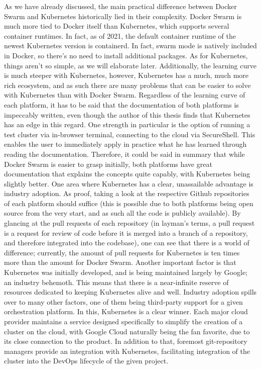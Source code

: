 \documentclass[thesis=B,english]{FITthesis}[2019/12/23]
\begin{document}
As we have already discussed, the main practical difference between Docker Swarm and Kubernetes historically lied in their complexity. Docker Swarm is much more tied to Docker itself than Kubernetes, which supports several container runtimes. In fact, as of 2021, the default container runtime of the newest Kubernetes version is containerd. \cite{kube-containerd} In fact, swarm mode is natively included in Docker, so there's no need to install additional packages. As for Kubernetes, things aren't so simple, as we will elaborate later. 
\newline
Additionally, the learning curve is much steeper with Kubernetes, however, Kubernetes has a much, much more rich ecosystem, and as such there are many problems that can be easier to solve with Kubernetes than with Docker Swarm. Regardless of the learning curve of each platform, it has to be said that the documentation of both platforms is impeccably written, even though the author of this thesis finds that Kubernetes has an edge in this regard. One strength in particular is the option of running a test cluster via in-browser terminal, connecting to the cloud via SecureShell. This enables the user to immediately apply in practice what he has learned through reading the documentation. Therefore, it could be said in summary that while Docker Swarm is easier to grasp initially, both platforms have great documentation that explains the concepts quite capably, with Kubernetes being slightly better.
\newline
One area where Kubernetes has a clear, unassailable advantage is industry adoption. As proof, taking a look at the respective Github repositories of each platform should suffice (this is possible due to both platforms being open source from the very start, and as such all the code is publicly available). By glancing at the pull requests of each repository (in layman's terms, a pull request is a request for review of code before it is merged into a branch of a repository, and therefore integrated into the codebase), one can see that there is a world of difference; currently, the amount of pull requests for Kubernetes is ten times more than the amount for Docker Swarm. \cite{swarm-pull, kube-pull} Another important factor is that Kubernetes was initially developed, and is being maintained largely by Google; an industry behemoth. This means that there is a near-infinite reserve of resources dedicated to keeping Kubernetes alive and well.
\newline
Industry adoption spills over to many other factors, one of them being third-party support for a given orchestration platform. In this, Kubernetes is a clear winner. Each major cloud provider maintains a service designed specifically to simplify the creation of a cluster on the cloud, with Google Cloud naturally being the fan favorite, due to its close connection to the product. In addition to that, foremost git-repository managers provide an integration with Kubernetes, facilitating integration of the cluster into the DevOps lifecycle of the given project.
\end{document}
